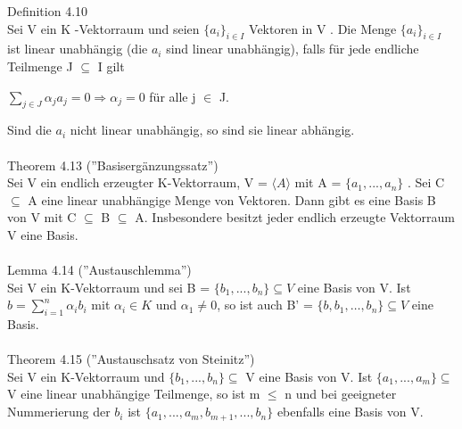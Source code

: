 Definition 4.10\\
Sei V ein K -Vektorraum und seien $\{a_i \}_{i \in I}$ Vektoren in V . Die Menge $\{a_i\}_{i \in I}$ ist linear unabhängig (die $a_i$ sind linear unabhängig), falls für jede endliche Teilmenge J $\subseteq$ I gilt
\begin{center}
$\sum\nolimits_{j \in J} \alpha_j a_j = 0 \Rightarrow \alpha_j = 0$ für alle j $\in$ J.
\end{center}
Sind die $a_i$ nicht linear unabhängig, so sind sie linear abhängig.\\ 
\\
Theorem 4.13 (”Basisergänzungssatz”)\\
Sei V ein endlich erzeugter K-Vektorraum, V = $\langle A \rangle$ mit A = $\{a_1,... ,a_n\}$ . Sei C $\subseteq$ A eine linear unabhängige Menge von Vektoren. Dann gibt es eine Basis B von V mit C $\subseteq$ B $\subseteq$ A. Insbesondere besitzt jeder endlich erzeugte Vektorraum V eine Basis.\\
\\
Lemma 4.14 (”Austauschlemma”)\\
Sei V ein K-Vektorraum und sei B = $\{b_1,... ,b_n\} \subseteq V$ eine Basis von V. Ist $b= \sum\nolimits_{i=1}^{n} \alpha_i b_i$ mit $\alpha_i \in K$ und $\alpha_1 \neq 0$, so ist auch B' = $\{ b, b_1, …, b_n \} \subseteq V$ eine Basis.\\
\\
Theorem 4.15 (”Austauschsatz von Steinitz”)\\
Sei V ein K-Vektorraum und $\{b_1,... ,b_n\} \subseteq$ V eine Basis von V. Ist $\{a_1,... ,a_m\} \subseteq$ V eine linear unabhängige Teilmenge, so ist m $\le$ n und bei geeigneter Nummerierung der $b_i$ ist $\{a_1,... ,a_m, b_{m+1},... ,b_n\}$ ebenfalls eine Basis von V. \\
